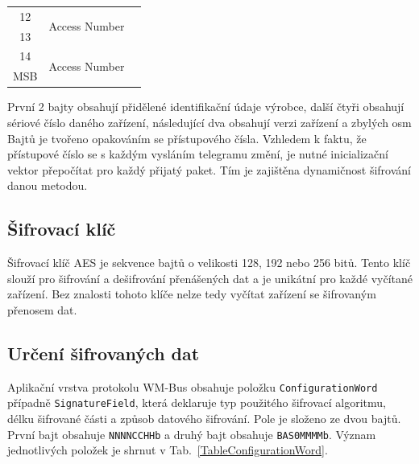 \begin{table}[!ht]
\begin{center}
\begin{tabular}{|c|c|l|}
12           & \multirow{2}{*}{Access Number} &                                        \\ \cline{1-1}
13           &                                &                                        \\ \cline{1-2}
14           & \multirow{2}{*}{Access Number} &                                        \\ \cline{1-1}
MSB          &                                &                                        \\ \hline \hline
\end{tabular}
\vspace{-20pt}
\end{center}
\end{table}

První 2 bajty obsahují přidělené identifikační údaje výrobce, další čtyři obsahují sériové číslo daného zařízení, následující dva obsahují verzi zařízení a zbylých osm Bajtů je tvořeno opakováním se přístupového čísla. Vzhledem k faktu, že přístupové číslo se s každým vysláním telegramu změní, je nutné inicializační vektor přepočítat pro každý přijatý paket. Tím je zajištěna dynamičnost šifrování danou metodou.

\newpage{}


\subsection{Šifrovací klíč}
Šifrovací klíč AES je sekvence bajtů o velikosti 128, 192 nebo 256 bitů. Tento klíč slouží pro šifrování a dešifrování přenášených dat a je unikátní pro každé vyčítané zařízení. Bez znalosti tohoto klíče nelze tedy vyčítat zařízení se šifrovaným přenosem dat.


\subsection{Určení šifrovaných dat}
\label{KapitolaConfigurationWord}
Aplikační vrstva protokolu WM-Bus obsahuje položku \texttt{ConfigurationWord} případně \texttt{SignatureField}, která deklaruje typ použitého šifrovací algoritmu, délku šifrované části a způsob datového šifrování. Pole je složeno ze dvou bajtů. První bajt obsahuje \texttt{NNNNCCHHb} a druhý bajt obsahuje \texttt{BAS0MMMMb}. Význam jednotlivých položek je shrnut v Tab.~\ref{TableConfigurationWord}.


